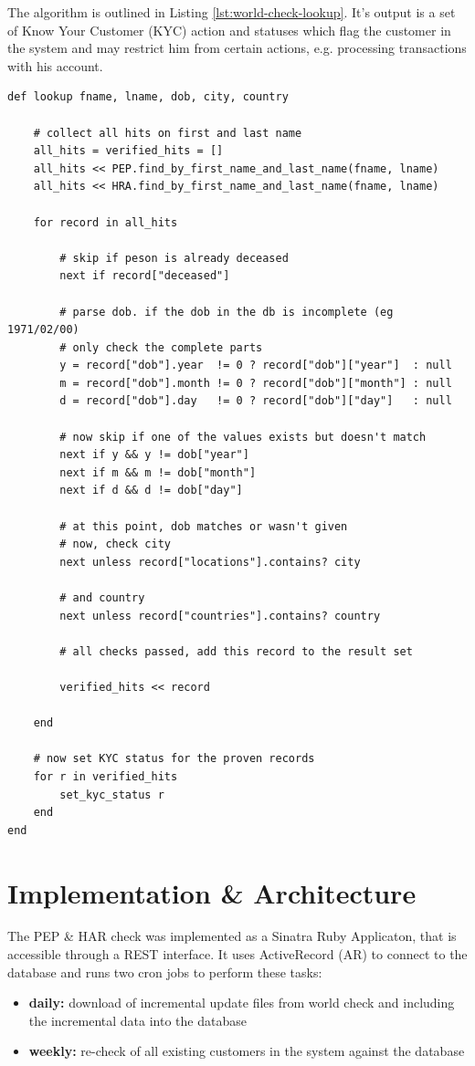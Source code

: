 \documentclass[a4paper, oneside]{csthesis}
\begin{document}
The algorithm is outlined in Listing \ref{lst:world-check-lookup}. It's output is a set of Know Your Customer (KYC) action and statuses which flag the customer in the system and may restrict him from certain actions, e.g. processing transactions with his account.

\begin{lstlisting}[caption={The Lookup algorithm},label={lst:world-check-lookup}]
def lookup fname, lname, dob, city, country

    # collect all hits on first and last name
    all_hits = verified_hits = []
    all_hits << PEP.find_by_first_name_and_last_name(fname, lname)
    all_hits << HRA.find_by_first_name_and_last_name(fname, lname)

    for record in all_hits

        # skip if peson is already deceased
        next if record["deceased"]

        # parse dob. if the dob in the db is incomplete (eg 1971/02/00)
        # only check the complete parts
        y = record["dob"].year  != 0 ? record["dob"]["year"]  : null
        m = record["dob"].month != 0 ? record["dob"]["month"] : null
        d = record["dob"].day   != 0 ? record["dob"]["day"]   : null

        # now skip if one of the values exists but doesn't match
        next if y && y != dob["year"]
        next if m && m != dob["month"]
        next if d && d != dob["day"]

        # at this point, dob matches or wasn't given
        # now, check city
        next unless record["locations"].contains? city

        # and country
        next unless record["countries"].contains? country

        # all checks passed, add this record to the result set

        verified_hits << record

    end

    # now set KYC status for the proven records
    for r in verified_hits
        set_kyc_status r
    end
end
\end{lstlisting}


\section{Implementation \& Architecture}

The PEP \& HAR check was implemented as a Sinatra Ruby Applicaton, that is accessible through a REST interface. It uses ActiveRecord (AR) to connect to the database and runs two cron jobs to perform these tasks:
\begin{itemize}
\item \textbf{daily:} download of incremental update files from world check and including the incremental data into the database
\item \textbf{weekly:} re-check of all existing customers in the system against the database
\end{itemize}
\end{document}
